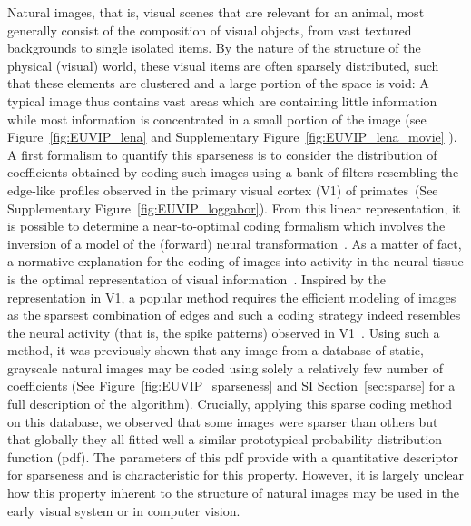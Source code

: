 \documentclass{article}
\begin{document}
Natural images, that is, visual scenes that are relevant for an animal, most generally consist of the composition of visual objects, from vast textured backgrounds to single isolated items. By the nature of the structure of the physical (visual) world, these visual items are often sparsely distributed, such that these elements are clustered and a large portion of the space is void: A typical image thus contains vast areas which are containing little information while most information is concentrated in a small portion of the image (see Figure~\ref{fig:EUVIP_lena}\if{} and Supplementary Figure~\ref{fig:EUVIP_lena_movie} \fi). A first formalism to quantify this sparseness is to consider the distribution of coefficients obtained by coding such images using a bank of filters resembling the edge-like profiles observed in the primary visual cortex (V1) of primates\if{}~(See Supplementary Figure~\ref{fig:EUVIP_loggabor})\fi. From this linear representation, it is possible to determine a near-to-optimal coding formalism which involves the inversion of a model of the (forward) neural transformation~\citep{Simoncelli2004}.  As a matter of fact, a normative explanation for the coding of images into activity in the neural tissue is the optimal representation of visual information~\citep{Atick92}. Inspired by the representation in V1, a popular method requires the efficient modeling of images as the sparsest combination of edges and such a coding strategy indeed resembles the neural activity (that is, the spike patterns) observed in V1~\citep{Perrinet15bicv}. Using such a method, it was previously shown that any image from a database of static, grayscale natural images may be coded using solely a relatively few number of coefficients (See Figure~\ref{fig:EUVIP_sparseness}\if{} and SI Section~\ref{sec:sparse} for a full description of the algorithm\fi). Crucially, applying this sparse coding method on this database, we observed that some images were sparser than others but that globally they all fitted well a similar prototypical probability distribution function (pdf). The parameters of this pdf provide with a quantitative descriptor for sparseness and is characteristic for this property. However, it is largely unclear how this property inherent to the structure of natural images may be used in the early visual system or in computer vision. %
\end{document}
